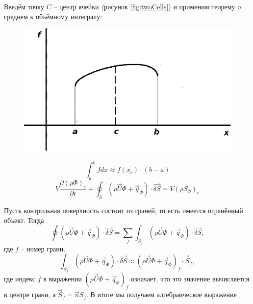 		Введём точку $C$ -- центр ячейки \textit(рисунок \ref{fig:twoCells}) и применим теорему о среднем к объёмному интегралу:
		\begin{figure}[h]
			\begin{minipage}{0.43\linewidth}
				\includegraphics[scale=0.4]{meanValueTheorem}
				\label{fig:meanValueTheorem}
			\end{minipage}
			\hspace{-1em}
			\begin{minipage}{0.6\linewidth}
				\begin{equation}
					\int_a^b fdx \approx f(x_c) \cdot (b-a)
				\end{equation}
				\begin{equation}
					V \frac{\partial \left(\rho \Phi\right)_c}{\partial t} + \oint_S \left( \rho \vec{U} \Phi + \vec{q}_{\Phi}  \right)\cdot \vec{\delta S} = V \left( \rho S_{\Phi} \right)_c
				\end{equation}
				\vspace{2em}
			\end{minipage}
		\end{figure}
		\clearpage
			Пусть контрольная поверхность состоит из граней, то есть имеется огранённый объект. Тогда
			\begin{equation}
				\oint\left(\rho \vec{U} \Phi + \vec{q}_{\Phi} \right) \cdot \vec{\delta S} = \sum_f \int_{S_f} \left(\rho \vec{U} \Phi + \vec{q}_{\Phi} \right) \cdot \vec{\delta S},
			\end{equation}
			где $f$ -- номер грани.
			\begin{equation}
				\int_{S_f} \left(\rho \vec{U} \Phi + \vec{q}_{\Phi} \right) \cdot \vec{\delta S} \approx \left(\rho \vec{U} \Phi + \vec{q}_{\Phi} \right)_f \cdot \vec{S}_f,
			\end{equation}
			где индекс $f$ в выражении $\left(\rho \vec{U} \Phi  + \vec{q}_{\Phi}\right)_f$ означает, что это значение вычисляется в центре грани, а $\vec{S}_f = \vec{n} S_f$. В итоге мы получаем алгебраическое выражение
